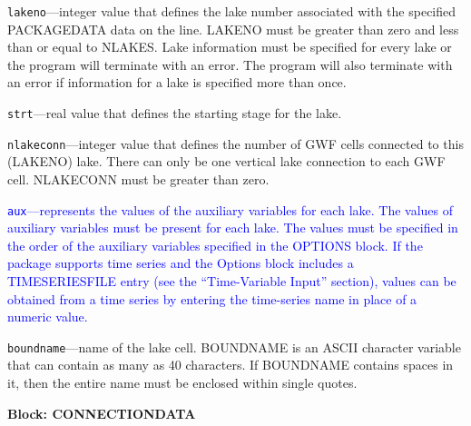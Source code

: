 \begin{description}
\item \texttt{lakeno}---integer value that defines the lake number associated with the specified PACKAGEDATA data on the line. LAKENO must be greater than zero and less than or equal to NLAKES. Lake information must be specified for every lake or the program will terminate with an error.  The program will also terminate with an error if information for a lake is specified more than once.

\item \texttt{strt}---real value that defines the starting stage for the lake.

\item \texttt{nlakeconn}---integer value that defines the number of GWF cells connected to this (LAKENO) lake. There can only be one vertical lake connection to each GWF cell. NLAKECONN must be greater than zero.

\item \textcolor{blue}{\texttt{aux}---represents the values of the auxiliary variables for each lake. The values of auxiliary variables must be present for each lake. The values must be specified in the order of the auxiliary variables specified in the OPTIONS block.  If the package supports time series and the Options block includes a TIMESERIESFILE entry (see the ``Time-Variable Input'' section), values can be obtained from a time series by entering the time-series name in place of a numeric value.}

\item \texttt{boundname}---name of the lake cell.  BOUNDNAME is an ASCII character variable that can contain as many as 40 characters.  If BOUNDNAME contains spaces in it, then the entire name must be enclosed within single quotes.

\end{description}
\item \textbf{Block: CONNECTIONDATA}

